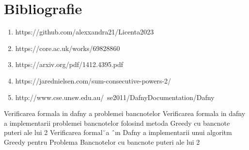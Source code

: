 \chapter*{Bibliografie} 

\begin{enumerate}
	\item https://github.com/alexxandra21/Licenta2023
	\item https://core.ac.uk/works/69828860
	\item https://arxiv.org/pdf/1412.4395.pdf
	\item https://jarednielsen.com/sum-consecutive-powers-2/
	\item http://www.cse.unsw.edu.au/~se2011/DafnyDocumentation/Dafny%
\end{enumerate}


Verificarea formala in dafny a problemei bancnotelor 
Verificarea formala in dafny a implementarii problemei bancnotelor folosind metoda Greedy cu bancnote puteri ale lui 2
Verificarea formal˘a ˆın Dafny a implementarii unui algoritm Greedy pentru Problema Bancnotelor cu bancnote puteri ale lui 2